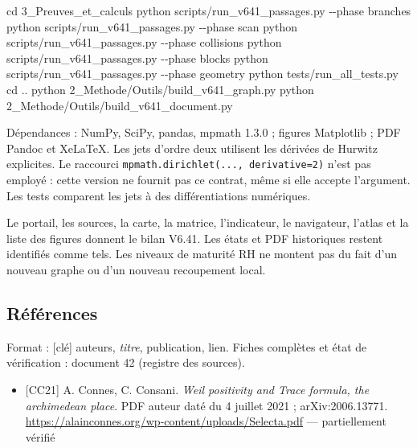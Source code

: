 \documentclass[
  10pt,
  a4paper,
]{article}
\newenvironment{Shaded}{}{}
\newcommand{\AttributeTok}[1]{\textcolor[rgb]{0.49,0.56,0.16}{#1}}
\newcommand{\BuiltInTok}[1]{\textcolor[rgb]{0.00,0.50,0.00}{#1}}
\newcommand{\ExtensionTok}[1]{#1}
\newcommand{\NormalTok}[1]{#1}
\providecommand{\tightlist}{%
  \setlength{\itemsep}{0pt}\setlength{\parskip}{0pt}}
\begin{document}
\begin{Shaded}
\begin{Highlighting}[]
\BuiltInTok{cd}\NormalTok{ 3\_Preuves\_et\_calculs}
\ExtensionTok{python}\NormalTok{ scripts/run\_v641\_passages.py }\AttributeTok{{-}{-}phase}\NormalTok{ branches}
\ExtensionTok{python}\NormalTok{ scripts/run\_v641\_passages.py }\AttributeTok{{-}{-}phase}\NormalTok{ scan}
\ExtensionTok{python}\NormalTok{ scripts/run\_v641\_passages.py }\AttributeTok{{-}{-}phase}\NormalTok{ collisions}
\ExtensionTok{python}\NormalTok{ scripts/run\_v641\_passages.py }\AttributeTok{{-}{-}phase}\NormalTok{ blocks}
\ExtensionTok{python}\NormalTok{ scripts/run\_v641\_passages.py }\AttributeTok{{-}{-}phase}\NormalTok{ geometry}
\ExtensionTok{python}\NormalTok{ tests/run\_all\_tests.py}
\BuiltInTok{cd}\NormalTok{ ..}
\ExtensionTok{python}\NormalTok{ 2\_Methode/Outils/build\_v641\_graph.py}
\ExtensionTok{python}\NormalTok{ 2\_Methode/Outils/build\_v641\_document.py}
\end{Highlighting}
\end{Shaded}

Dépendances : NumPy, SciPy, pandas, mpmath 1.3.0 ; figures Matplotlib ;
PDF Pandoc et XeLaTeX. Les jets d'ordre deux utilisent les dérivées de
Hurwitz explicites. Le raccourci
\texttt{mpmath.dirichlet(...,\ derivative=2)} n'est pas employé : cette
version ne fournit pas ce contrat, même si elle accepte l'argument. Les
tests comparent les jets à des différentiations numériques.

Le portail, les sources, la carte, la matrice, l'indicateur, le
navigateur, l'atlas et la liste des figures donnent le bilan V6.41. Les
états et PDF historiques restent identifiés comme tels. Les niveaux de
maturité RH ne montent pas du fait d'un nouveau graphe ou d'un nouveau
recoupement local.

\hypertarget{ruxe9fuxe9rences}{%
\subsection{Références}\label{ruxe9fuxe9rences}}

Format : {[}clé{]} auteurs, \emph{titre}, publication, lien. Fiches
complètes et état de vérification : document 42 (registre des sources).

\begin{itemize}
\tightlist
\item
  {[}CC21{]} A. Connes, C. Consani. \emph{Weil positivity and Trace
  formula, the archimedean place}. PDF auteur daté du 4 juillet 2021 ;
  arXiv:2006.13771.
  \url{https://alainconnes.org/wp-content/uploads/Selecta.pdf} ---
  partiellement vérifié
\end{itemize}
\end{document}
